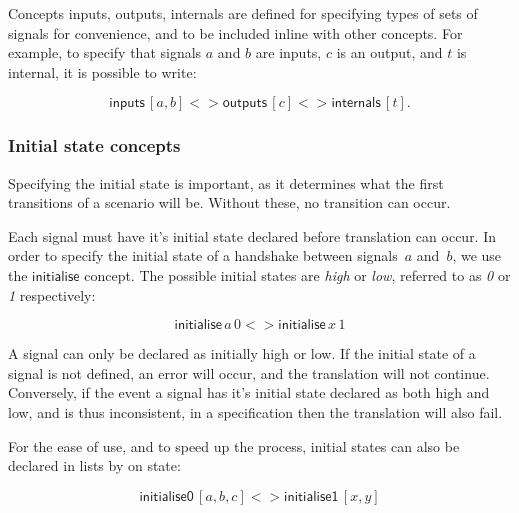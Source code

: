 \documentclass[british,conference,compsoc]{IEEEtran}
\begin{document}
Concepts \textsf{inputs}, \textsf{outputs}, \textsf{internals} are defined for
specifying types of sets of signals for convenience, and to be included inline 
with other concepts. For example, to specify that signals $a$ and $b$ are 
inputs, $c$ is an output, and $t$ is internal, it is possible to write:

\vspace{-4mm}

\[
\mathsf{inputs}\,[a, b] <> \mathsf{outputs}\,[c] <>
\mathsf{internals}\,[t].
\]

\vspace{-4mm}

\subsubsection{Initial state concepts\label{sub:initState}}

Specifying the initial state is important, as it determines what the first 
transitions of a scenario will be. Without these, no transition can occur.

Each signal must have it's initial state declared before translation can occur. 
In order to specify the initial state of a handshake between signals~$a$
and~$b$, we use the $\mathsf{initialise}$ concept.
The possible initial states are \emph{high} or \emph{low}, referred to as 
\emph{0} or \emph{1} respectively:

\vspace{-2mm}

\[
\mathsf{initialise}\,a\,0 <> \mathsf{initialise}\,x\, 1
\]

\vspace{-1mm}

\noindent A signal can only be declared as initially high or low. If the 
initial state of a signal is not defined, an error will occur, and the 
translation will not continue. Conversely, if the event a signal has it's 
initial state declared as both high and low, and is thus inconsistent, in a 
specification then the translation will also fail.

For the ease of use, and to speed up the process, initial states can also be 
declared in lists by on state:

\vspace{-2mm}

\[
\mathsf{initialise0}\, [a, b, c] <> \mathsf{initialise1}\, [x, y]
\]

\vspace{-1mm}
\end{document}
